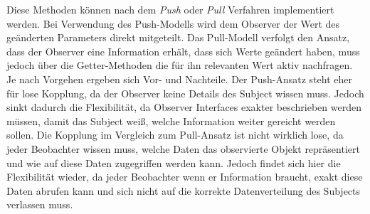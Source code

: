 Diese Methoden können nach dem \textit{Push} oder \textit{Pull} Verfahren implementiert werden. Bei Verwendung des Push-Modells wird dem Observer der Wert des geänderten Parameters direkt mitgeteilt. Das Pull-Modell verfolgt den Ansatz, dass der Observer eine Information erhält, dass sich Werte geändert haben, muss jedoch über die Getter-Methoden die für ihn relevanten Wert aktiv nachfragen. Je nach Vorgehen ergeben sich Vor- und Nachteile. Der Push-Ansatz steht eher für lose Kopplung, da der Observer keine Details des Subject wissen muss. Jedoch sinkt dadurch die Flexibilität, da Observer Interfaces exakter beschrieben werden müssen, damit das Subject weiß, welche Information weiter gereicht werden sollen. Die Kopplung im Vergleich zum Pull-Ansatz ist nicht wirklich lose, da jeder Beobachter wissen muss, welche Daten das observierte Objekt repräsentiert und wie auf diese Daten zugegriffen werden kann. Jedoch findet sich hier die Flexibilität wieder, da jeder Beobachter wenn er Information braucht, exakt diese Daten abrufen kann und sich nicht auf die korrekte Datenverteilung des Subjects verlassen muss. 

